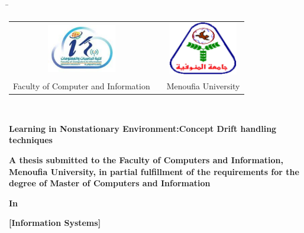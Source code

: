 

\begin{titlepage}
    \begin{tabbing}
        \hspace{1cm} %
        \= \kill %
        \begin{tabular}{ccc} %
          \includegraphics[width=3cm]{0_frontmatter/figures/PNG/faculty_image.png} & \hspace{2.5cm} & \includegraphics[width=3cm]{0_frontmatter/figures/PNG/menoufia_logo.png} \\
          \multicolumn{1}{l}{Faculty of Computer and Information} & \hspace{2.5cm}  & \multicolumn{1}{l}{Menoufia  University} \\
        \end{tabular}\\
    \end{tabbing}
    \begin{center}
        \vspace{0.5cm}

        \textbf{\Huge \normalfont Learning in Nonstationary Environment:Concept Drift handling techniques} 
        \vspace{0.6cm}
        
        \textbf{\large \normalfont A thesis submitted to the Faculty of Computers and Information, Menoufia University, in partial fulfillment of the requirements for the degree of Master of Computers and Information} \\
        \vspace{0.4cm}
        
        \textbf{\large In} \\
        \vspace{0.3cm}
        
        \textbf{\Large [Information Systems]} \\
        \vspace{0.6cm}
        

\end{center}
\end{titlepage}
